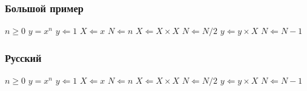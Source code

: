\subsubsection{Большой пример}

\begin{algorithmic}
	\REQUIRE $n \geq 0$
	\ENSURE $y = x^n$
	\STATE $y \Leftarrow 1$
	\STATE $X \Leftarrow x$
	\STATE $N \Leftarrow n$
			\STATE $X \Leftarrow X \times X$
			\STATE $N \Leftarrow N / 2$
		\ELSE[$N$ is odd]
			\STATE $y \Leftarrow y \times X$
			\STATE $N \Leftarrow N - 1$
		\ENDIF
	\ENDWHILE
\end{algorithmic}

\subsubsection{Русский}

\realgorithmic

\begin{algorithmic}
	\REQUIRE $n \geq 0$
	\ENSURE $y = x^n$
	\STATE $y \Leftarrow 1$
	\STATE $X \Leftarrow x$
	\STATE $N \Leftarrow n$
			\STATE $X \Leftarrow X \times X$
			\STATE $N \Leftarrow N / 2$
		\ELSE[$N$ is odd]
			\STATE $y \Leftarrow y \times X$
			\STATE $N \Leftarrow N - 1$
		\ENDIF
	\ENDWHILE
\end{algorithmic}

\pagebreak %
